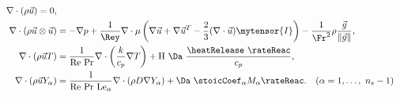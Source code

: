 \begin{subequations}
	\begin{align}
	\nabla \cdot (\rho \vec{u})   = 0, \label{eq:LowMachConti}\\\nabla \cdot (\rho \vec{u} \otimes \vec{u})  & = - \nabla p + \frac{1}{\Rey}\nabla \cdot \mu\left( \nabla \vec{u} +\nabla \vec{u}^T  - \frac{2}{3}(\nabla\cdot \vec{u})\mytensor{I} \right)  - \frac{1}{\Fr^2}\rho\frac{\vec{g}}{\Vert \vec{g} \Vert}, \label{eq:LowMachMomentum}\\\nabla \cdot (\rho \vec{u} T) & = \frac{1}{\text{Re}~\text{Pr}}\nabla \cdot\left(\frac{k}{c_p} \nabla T\right)+  
	\text{H}~\Da~\frac{\heatRelease~\rateReac}{c_p}, \label{eq:LowMachEnergy}\\ 
	\nabla \cdot (\rho  \vec{u}Y_\alpha)  & = \frac{1}{\text{Re}~\text{Pr}~\text{Le}_\alpha}\nabla \cdot(\rho D \nabla Y_\alpha)+  \Da~\stoicCoef_\alpha M_\alpha \rateReac. \quad (\alpha = 1, \dots,~n_s - 1) \label{eq:LowMachMassBalance} 
	\end{align}
	\label{eq:all-eq}
\end{subequations}


